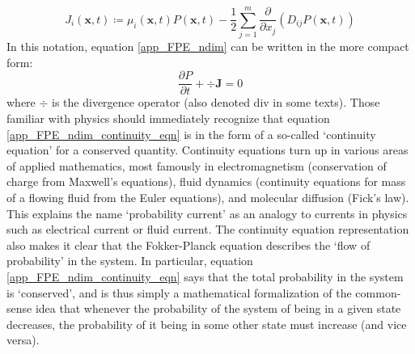 \begin{equation*}
J_i(\mathbf{x},t) \coloneqq \mu_i(\mathbf{x},t)P(\mathbf{x},t) - \frac{1}{2}\sum\limits_{j=1}^{m}\frac{\partial}{\partial x_j}\left(D_{ij}P(\mathbf{x},t)\right)
\end{equation*}
In this notation, equation \eqref{app_FPE_ndim} can be written in the more compact form:
\begin{equation}
\label{app_FPE_ndim_continuity_eqn}
\frac{\partial P}{\partial t}  + \div{\mathbf{J}} = 0
\end{equation}
where $\div$ is the divergence operator (also denoted $\mathrm{div}$ in some texts). Those familiar with physics should immediately recognize that equation \eqref{app_FPE_ndim_continuity_eqn} is in the form of a so-called `continuity equation' for a conserved quantity. Continuity equations turn up in various areas of applied mathematics, most famously in electromagnetism (conservation of charge from Maxwell's equations), fluid dynamics (continuity equations for mass of a flowing fluid from the Euler equations), and molecular diffusion (Fick's law). This explains the name `probability current' as an analogy to currents in physics such as electrical current or fluid current. The continuity equation representation also  makes it clear that the Fokker-Planck equation describes the `flow of probability' in the system. In particular, equation \eqref{app_FPE_ndim_continuity_eqn} says that the total probability in the system is `conserved', and is thus simply a mathematical formalization of the common-sense idea that whenever the probability of the system of being in a given state decreases, the probability of it being in some other state must increase (and vice versa).
